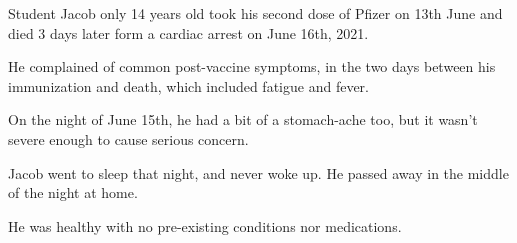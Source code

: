 Student Jacob only 14 years old took his second dose of Pfizer on 13th June and
died 3 days later form a cardiac arrest on June 16th, 2021.

He complained of common post-vaccine symptoms, in the two days between his
immunization and death, which included fatigue and fever.

On the night of June 15th, he had a bit of a stomach-ache too, but it wasn’t
severe enough to cause serious concern.

Jacob went to sleep that night, and never woke up. He passed away in the middle
of the night at home.

He was healthy with no pre-existing conditions nor medications.


